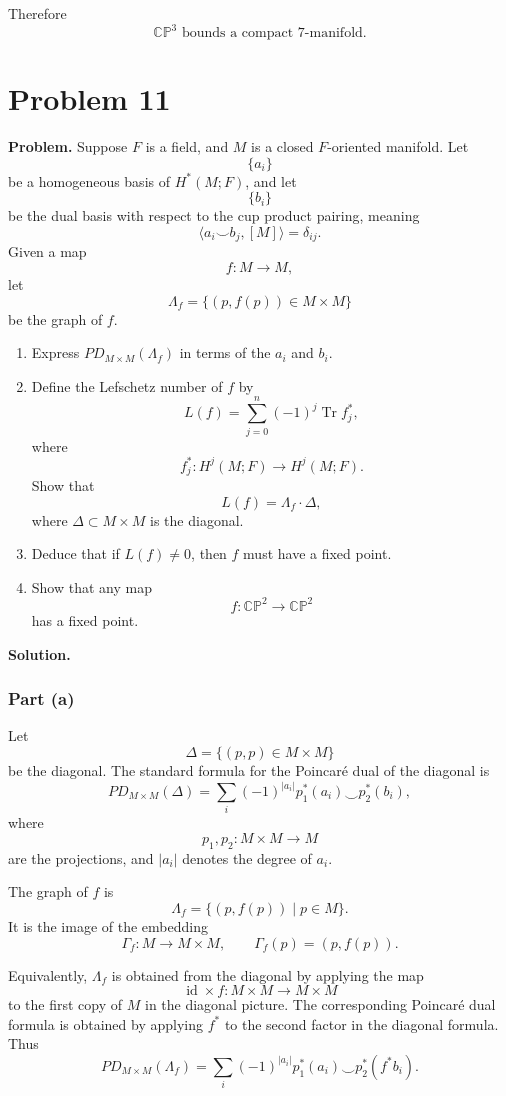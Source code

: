 \documentclass[12pt,a4paper]{article}
\theoremstyle{notespace}
\begin{document}
Therefore
\[
\boxed{
	\mathbb{CP}^3
	\text{ bounds a compact }7\text{-manifold.}
}
\]

\section{Problem 11}

\textbf{Problem.}
Suppose \(F\) is a field, and \(M\) is a closed \(F\)-oriented manifold. Let
\[
\{a_i\}
\]
be a homogeneous basis of \(H^*(M;F)\), and let
\[
\{b_i\}
\]
be the dual basis with respect to the cup product pairing, meaning
\[
\langle a_i\smile b_j,[M]\rangle=\delta_{ij}.
\]
Given a map
\[
f:M\to M,
\]
let
\[
\Lambda_f=\{(p,f(p))\in M\times M\}
\]
be the graph of \(f\).

\begin{enumerate}
	\item[(a)] Express \(PD_{M\times M}(\Lambda_f)\) in terms of the \(a_i\) and \(b_i\).
	\item[(b)] Define the Lefschetz number of \(f\) by
	\[
	L(f)=\sum_{j=0}^{n}(-1)^j\operatorname{Tr} f_j^*,
	\]
	where
	\[
	f_j^*:H^j(M;F)\to H^j(M;F).
	\]
	Show that
	\[
	L(f)=\Lambda_f\cdot \Delta,
	\]
	where \(\Delta\subset M\times M\) is the diagonal.
	\item[(c)] Deduce that if \(L(f)\neq 0\), then \(f\) must have a fixed point.
	\item[(d)] Show that any map
	\[
	f:\mathbb{CP}^2\to \mathbb{CP}^2
	\]
	has a fixed point.
\end{enumerate}

\medskip

\noindent\textbf{Solution.}

\subsubsection*{Part (a)}

Let
\[
\Delta=\{(p,p)\in M\times M\}
\]
be the diagonal. The standard formula for the Poincar\'e dual of the diagonal is
\[
PD_{M\times M}(\Delta)
=
\sum_i (-1)^{|a_i|}
p_1^*(a_i)\smile p_2^*(b_i),
\]
where
\[
p_1,p_2:M\times M\to M
\]
are the projections, and \(|a_i|\) denotes the degree of \(a_i\).

The graph of \(f\) is
\[
\Lambda_f=\{(p,f(p))\mid p\in M\}.
\]
It is the image of the embedding
\[
\Gamma_f:M\to M\times M,
\qquad
\Gamma_f(p)=(p,f(p)).
\]

Equivalently, \(\Lambda_f\) is obtained from the diagonal by applying the map
\[
\operatorname{id}\times f:M\times M\to M\times M
\]
to the first copy of \(M\) in the diagonal picture. The corresponding
Poincar\'e dual formula is obtained by applying \(f^*\) to the second factor in
the diagonal formula. Thus
\[
PD_{M\times M}(\Lambda_f)
=
\sum_i (-1)^{|a_i|}
p_1^*(a_i)\smile p_2^*(f^*b_i).
\]
\end{document}
